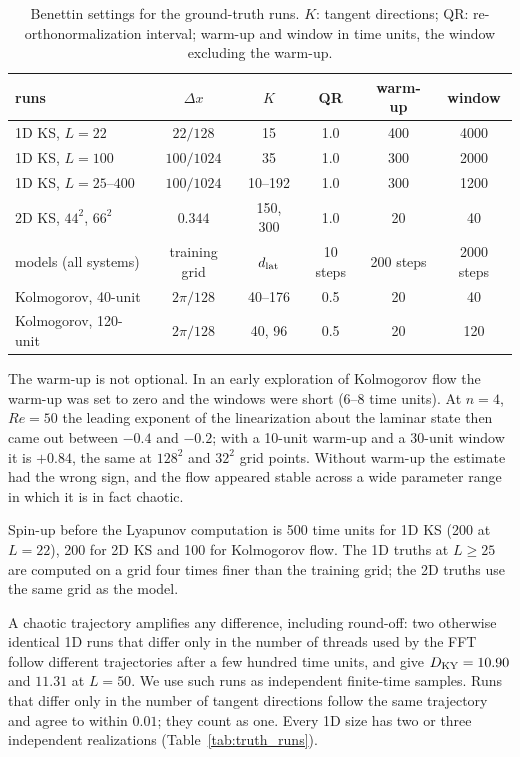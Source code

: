 \begin{table}[htbp]
\caption{Benettin settings for the ground-truth runs. $K$: tangent
directions; QR: re-orthonormalization interval; warm-up and window in
time units, the window excluding the warm-up.}
\label{tab:benettin}
\begin{ruledtabular}
\begin{tabular}{lccccc}
runs & $\Delta x$ & $K$ & QR & warm-up & window \\
\hline
1D KS, $L=22$ & $22/128$ & 15 & 1.0 & 400 & 4000 \\
1D KS, $L=100$ & $100/1024$ & 35 & 1.0 & 300 & 2000 \\
1D KS, $L=25$--$400$ & $100/1024$ & 10--192 & 1.0 & 300 & 1200 \\
2D KS, $44^2$, $66^2$ & $0.344$ & 150, 300 & 1.0 & 20 & 40 \\
models (all systems) & training grid & $d_{\mathrm{lat}}$ & 10 steps & 200 steps & 2000 steps \\
Kolmogorov, 40-unit & $2\pi/128$ & 40--176 & 0.5 & 20 & 40 \\
Kolmogorov, 120-unit & $2\pi/128$ & 40, 96 & 0.5 & 20 & 120 \\
\end{tabular}
\end{ruledtabular}
\end{table}

The warm-up is not optional. In an early exploration of Kolmogorov flow
the warm-up was set to zero and the windows were short (6--8 time units).
At $n=4$, $Re=50$ the leading exponent of the linearization about the
laminar state then came out between $-0.4$ and $-0.2$; with a 10-unit
warm-up and a 30-unit window it is $+0.84$, the same at $128^2$ and $32^2$
grid points. Without warm-up the estimate had the wrong sign, and the
flow appeared stable across a wide parameter range in which it is in fact
chaotic.

Spin-up before the Lyapunov computation is 500 time units for 1D KS
(200 at $L=22$), 200 for 2D KS and 100 for Kolmogorov flow. The 1D truths
at $L\ge25$ are computed on a grid four times finer than the training
grid; the 2D truths use the same grid as the model.

 A chaotic trajectory amplifies any
difference, including round-off: two otherwise identical 1D runs that
differ only in the number of threads used by the FFT follow different
trajectories after a few hundred time units, and give $D_{\mathrm{KY}}=10.90$ and
$11.31$ at $L=50$. We use such runs as independent finite-time samples.
Runs that differ only in the number of tangent directions follow the
same trajectory and agree to within $0.01$; they count as one. Every
1D size has two or three independent realizations
(Table~\ref{tab:truth_runs}).

